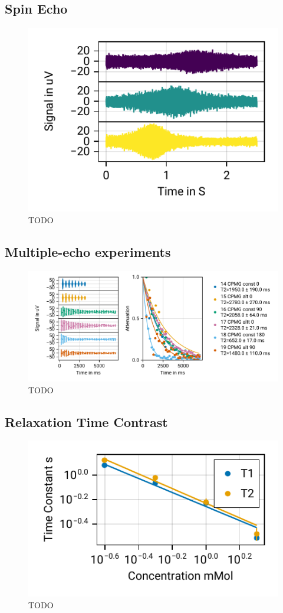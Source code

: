 \documentclass[
    parskip=half, 
    twoside=false,
    twocolumn=true,
    fontsize=11pt,
]{scrarticle}
\begin{document}
\subsection{Spin Echo}
\begin{figure}
    \centering
    \includegraphics{figures/04 spin echo shims.pdf}
    \caption{TODO}
\end{figure}

\subsection{Multiple-echo experiments}
\begin{figure}
    \centering
    \includegraphics{figures/05 CPMG.pdf}
    \caption{TODO}
\end{figure}

\subsection{Relaxation Time Contrast}
\begin{figure}
    \centering
    \includegraphics{figures/06 contrast.pdf}
    \caption{TODO}
\end{figure}
\end{document}
